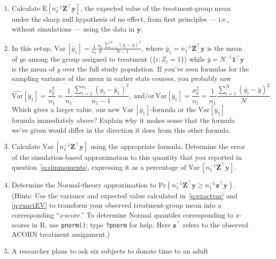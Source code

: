\documentclass{article}
\renewcommand{\bm}[1]{\boldsymbol{#1}} %
\begin{document}
\begin{enumerate}
\item Calculate $\mathrm{E} [ n_{1}^{-1}\bm{Z}^{\top}\bm{y} ]$, the expected value of the
  treatment-group mean under the sharp null hypothesis of no effect, from first principles --- i.e., without simulations ---  using the data in $\bm{y}$.  \label{q:exactEV}
\item In this setup, $\mathrm{Var}\, [\bar{y}_{1}]  = \frac{1}{n_{1}}
  \frac{n_0}{N} \frac{\sum_{i=1}^{N} (y_{i} - \bar y)^{2}}{N-1} $,
  where $\bar{y}_{1} = n_{1}^{-1}\bm{Z}^{\top}\bm{y}$ is the mean of
  $y$s among the group assigned to treatment ($\{i: Z_{i} =1\}$) while
  $\bar{y} = N^{-1}\bm{1}^{\top}\bm{y}$ is the mean of $y$ over
  the full study population.  If you've seen formulas for the sampling
  variance of the mean in earlier stats
  courses, you probably saw
  $$
  \widehat{\mathrm{Var}} \left[\bar{y}_{1}\right] = \frac{s^{2}_{y}}{n_{1}} = \frac{1}{n_{1}}
  \frac{\sum_{i=1}^{n_{1}} (y_{i} - \bar{y}_{1})^{2}}{n_{1}-1},
\, \mathrm{and/or}\,
  \mathrm{Var} \left[\bar{y}_{1}\right] = \frac{\sigma_{y}^{2}}{n_{1}} = \frac{1}{n_{1}}
  \frac{\sum_{i=1}^{N} (y_{i} - \bar{y})^{2}}{N}.
  $$
Which gives a larger value, our new $\mathrm{Var}\,
[\bar{y}_{1}]$-formula or the  $\mathrm{Var} \left[\bar{y}_{1}\right]$
formula immediately above?  Explain why it makes
sense that the formula we've given would differ in the direction it does
from this other formula. %
\item Calculate $\mathrm{Var}\, [n_{1}^{-1}\bm{Z}^{\top}\bm{y}]$ using the appropriate
  formula.   Determine the error of the simulation-based
  approximation to this quantity that you reported in question~\ref{q:simmoments},
  expressing it as a percentage of $\mathrm{Var}\,[ n_{1}^{-1}\bm{Z}^{\top}\bm{y}]$. \label{q:exactvar}
\item Determine the Normal-theory approximation to
  $\mathrm{Pr}(n_{1}^{-1}\bm{Z}^{\top}\bm{y} \geq
  n_{1}^{-1}\bm{z}^{\top}\bm{y} ) $.  (Hints: Use the variance and
  expected value calculated in~\ref{q:exactvar} and \ref{q:exactEV} to transform your
  observed treatment-group mean into a corresponding ``$z$-score.''
  To determine Normal quantiles corresponding to z-scores in R, use
  \texttt{pnorm()}; type \texttt{?pnorm} for help. Here $\bm{z}^{\top}$ refers to
  the observed ACORN treatment assignment.)
\item %
A researcher plans to ask six subjects to donate time to an adult

\end{enumerate}
\end{document}
